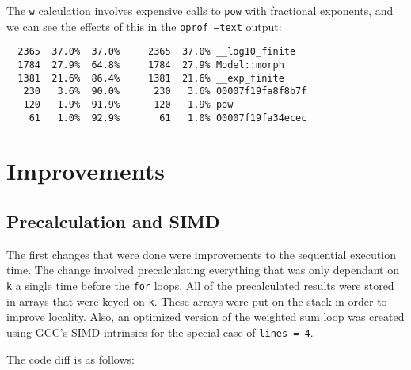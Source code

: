 \documentclass[12pt]{article}
\begin{document}
The \texttt{w} calculation involves expensive calls to \texttt{pow}
with fractional exponents, and we can see the effects of this in the
\texttt{pprof --text} output:

\begin{lstlisting}
  2365  37.0%  37.0%     2365  37.0% __log10_finite
  1784  27.9%  64.8%     1784  27.9% Model::morph
  1381  21.6%  86.4%     1381  21.6% __exp_finite
   230   3.6%  90.0%      230   3.6% 00007f19fa8f8b7f
   120   1.9%  91.9%      120   1.9% pow
    61   1.0%  92.9%       61   1.0% 00007f19fa34ecec
\end{lstlisting}

\section*{Improvements}

\subsection*{Precalculation and SIMD}

The first changes that were done were improvements to the sequential
execution time. The change involved precalculating everything that was
only dependant on \texttt{k} a single time before the \texttt{for}
loops. All of the precalculated results were stored in arrays that
were keyed on \texttt{k}. These arrays were put on the stack in order
to improve locality. Also, an optimized version of the weighted sum
loop was created using GCC's SIMD intrinsics for the special case of
\texttt{lines = 4}. 

The code diff is as follows:
\end{document}
